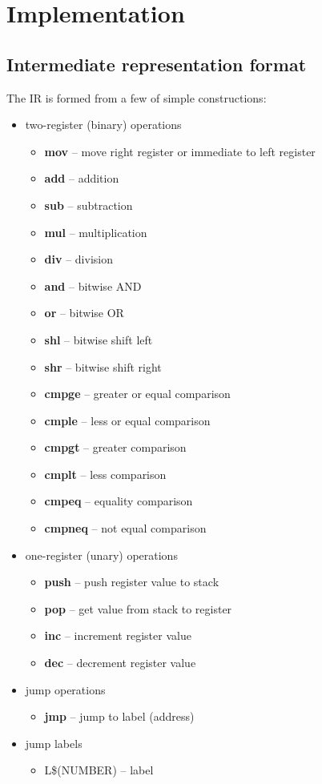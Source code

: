 \documentclass{article}
\begin{document}
	\section{Implementation}
	
		\subsection{Intermediate representation format}
			The IR is formed from a few of simple constructions:
			\begin{itemize}
				\item two-register (binary) operations
				\begin{itemize}
					\item \textbf{mov} -- move right register or immediate to left register
					\item \textbf{add} -- addition
					\item \textbf{sub} -- subtraction
					\item \textbf{mul} -- multiplication
					\item \textbf{div} -- division
					\item \textbf{and} -- bitwise AND
					\item \textbf{or} -- bitwise OR
					\item \textbf{shl} -- bitwise shift left
					\item \textbf{shr} -- bitwise shift right
					\item \textbf{cmpge} -- greater or equal comparison
					\item \textbf{cmple} -- less or equal comparison
					\item \textbf{cmpgt} -- greater comparison
					\item \textbf{cmplt} -- less comparison
					\item \textbf{cmpeq} -- equality comparison
					\item \textbf{cmpneq} -- not equal comparison
				\end{itemize}
				
				\item one-register (unary) operations
				\begin{itemize}
					\item \textbf{push} -- push register value to stack
					\item \textbf{pop} -- get value from stack to register
					\item \textbf{inc} -- increment register value
					\item \textbf{dec} -- decrement register value
				\end{itemize}
				
				\item jump operations
				\begin{itemize}
					\item \textbf{jmp} -- jump to label (address)					
				\end{itemize}
				
				\item jump labels
				\begin{itemize}
					\item L\$(NUMBER) -- label
				\end{itemize}
				
			\end{itemize}
			
\end{document}
